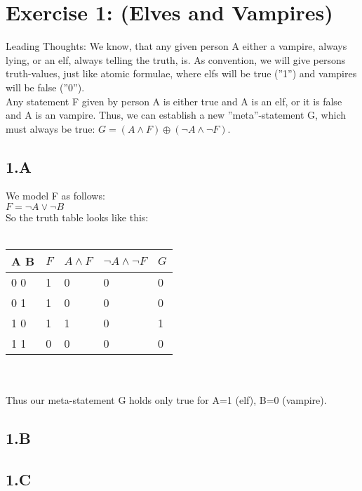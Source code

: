 \documentclass[12pt]{article}
\begin{document}
 

\rhead{\today}


\section*{Exercise 1: (Elves and Vampires)}

Leading Thoughts: We know, that any given person A either a vampire, always lying, or an elf, always telling the truth, is. As convention, we will give persons truth-values, just like atomic formulae, where elfs will be true (''1'') and vampires will be false (''0'').\\
Any statement F given by person A is either true and A is an elf, or it is false and A is an vampire. Thus, we can establish a new ''meta''-statement G, which must always be true: $G = (A \land F) \oplus ( \neg A \land \neg F )$. 

\subsection*{1.A}

We model F as follows:\\
$F = \neg A \lor \neg B$ \\
So the truth table looks like this:\\\\
\begin{tabular}{  l | l | l | l | l}
	A B & $F$ & $A \land F $ & $\neg A \land \neg F$ & $G$ \\ \hline
	0 0 & 1 & 0 & 0 & 0 \\
	0 1 & 1 & 0 & 0 & 0 \\
	1 0 & 1 & 1 & 0 & 1 \\
	1 1 & 0 & 0 & 0 & 0 \\
\end{tabular} \\\\
Thus our meta-statement G holds only true for A=1 (elf), B=0 (vampire).

\subsection*{1.B}

\subsection*{1.C}
\end{document}

